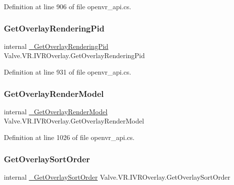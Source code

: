 Definition at line 906 of file openvr\+\_\+api.\+cs.

\mbox{\label{struct_valve_1_1_v_r_1_1_i_v_r_overlay_a5b1fc4a6cfeb762431eed8c71165f952}} 
\subsubsection{\texorpdfstring{GetOverlayRenderingPid}{GetOverlayRenderingPid}}
{\footnotesize\ttfamily internal \mbox{\hyperlink{struct_valve_1_1_v_r_1_1_i_v_r_overlay_a3d5ff014664a9f79caa2c148682a6d30}{\+\_\+\+Get\+Overlay\+Rendering\+Pid}} Valve.\+V\+R.\+I\+V\+R\+Overlay.\+Get\+Overlay\+Rendering\+Pid}



Definition at line 931 of file openvr\+\_\+api.\+cs.

\mbox{\label{struct_valve_1_1_v_r_1_1_i_v_r_overlay_aa445b10a62d173396e90fa11d8e726d3}} 
\subsubsection{\texorpdfstring{GetOverlayRenderModel}{GetOverlayRenderModel}}
{\footnotesize\ttfamily internal \mbox{\hyperlink{struct_valve_1_1_v_r_1_1_i_v_r_overlay_a97891b66fe3f14691f4eb8f6642ad5ef}{\+\_\+\+Get\+Overlay\+Render\+Model}} Valve.\+V\+R.\+I\+V\+R\+Overlay.\+Get\+Overlay\+Render\+Model}



Definition at line 1026 of file openvr\+\_\+api.\+cs.

\mbox{\label{struct_valve_1_1_v_r_1_1_i_v_r_overlay_a103941f9dbe50d41856eb5a5ff55710a}} 
\subsubsection{\texorpdfstring{GetOverlaySortOrder}{GetOverlaySortOrder}}
{\footnotesize\ttfamily internal \mbox{\hyperlink{struct_valve_1_1_v_r_1_1_i_v_r_overlay_a7e5ffdaf685b8384808a52d2fef43022}{\+\_\+\+Get\+Overlay\+Sort\+Order}} Valve.\+V\+R.\+I\+V\+R\+Overlay.\+Get\+Overlay\+Sort\+Order}



